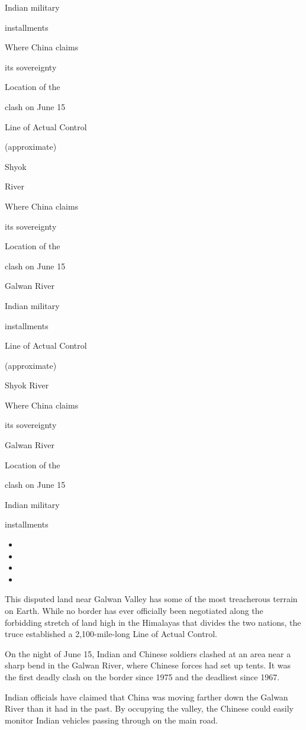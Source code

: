 Indian military

installments

Where China claims

its sovereignty

Location of the

clash on June 15

Line of Actual Control

(approximate)

Shyok

River

Where China claims

its sovereignty

Location of the

clash on June 15

Galwan River

Indian military

installments

Line of Actual Control

(approximate)

Shyok River

Where China claims

its sovereignty

Galwan River

Location of the

clash on June 15

Indian military

installments

\begin{itemize}
\item
\item
\item
\item
\end{itemize}

This disputed land near Galwan Valley has some of the most treacherous
terrain on Earth. While no border has ever officially been negotiated
along the forbidding stretch of land high in the Himalayas that divides
the two nations, the truce established a 2,100-mile-long Line of Actual
Control.

On the night of June 15, Indian and Chinese soldiers clashed at an area
near a sharp bend in the Galwan River, where Chinese forces had set up
tents. It was the first deadly clash on the border since 1975 and the
deadliest since 1967.

Indian officials have claimed that China was moving farther down the
Galwan River than it had in the past. By occupying the valley, the
Chinese could easily monitor Indian vehicles passing through on the main
road.


